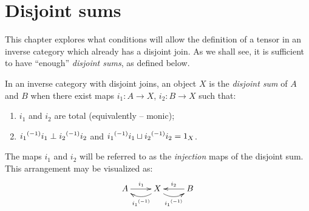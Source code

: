 \section{Disjoint sums} %
\label{sub:disjoint_sums}

This chapter explores what conditions will allow the definition of a  tensor in an inverse category
which already has a disjoint join. As we shall see, it is sufficient to have ``enough''
\emph{disjoint sums}, as defined below.

\begin{definition}\label{def:disjoint_sum}
  In an inverse category with disjoint joins, an object $X$ is the \emph{disjoint sum} of $A$ and
  $B$ when there exist maps $i_1 : A \to X$, $i_2: B \to X$ such that:
  \begin{enumerate}[{(}i{)}]
    \item $i_1$ and $i_2$ are total (equivalently -- monic);
    \item ${i_1}^{(-1)}i_1 \perp {i_2}^{(-1)}i_2$ and ${i_1}^{(-1)}i_1 \sqcup {i_2}^{(-1)}i_2 = 1_X$.
  \end{enumerate}
  The maps $i_1$ and $i_2$ will be referred to as the \emph{injection} maps of the disjoint
  sum. This arrangement may be visualized as:
  \[
    \xymatrix{
      A\ar[r]^{i_1} &X\ar@/^9pt/[l]^{\inv{i_1}} \ar@/_9pt/[r]_{\inv{i_1}} & B \ar[l]_{i_2}
    }
   \]
\end{definition}

